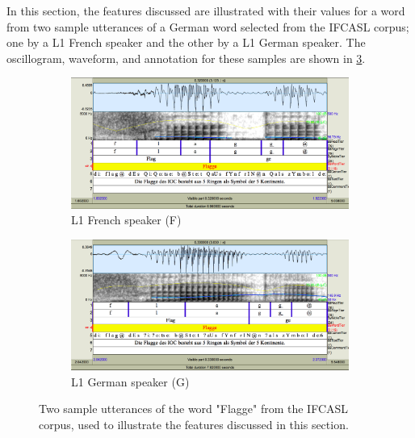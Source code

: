 	
	In this section, the features discussed are illustrated with their values for a word from two sample utterances of a German word selected from the IFCASL corpus; one by a L1 French speaker and the other by a L1 German speaker. The oscillogram, waveform, and annotation for these samples are shown in \cref{fig:featuresexample}.
	
	\begin{figure}
		\centering
		\begin{subfigure}[t]{\textwidth}
                \includegraphics[width=\textwidth]{img/screenshots/2SH05_FGMB1_527-flagge}
                \caption{L1 French speaker (F)}
                \label{fig:featuresexample:fg}
        \end{subfigure}%
        \vspace{1.5em}
                \vspace{1.5em}

        \begin{subfigure}[b]{\textwidth}
                \includegraphics[width=\textwidth]{img/screenshots/2SH05_GGMB2_035-flagge}
                \caption{L1 German speaker (G)}
                \label{fig:featuresexample:gg}
        \end{subfigure}%
		\caption{Two sample utterances of the word "Flagge" from the IFCASL corpus, used to illustrate the features discussed in this section. }
		\label{fig:featuresexample}
	\end{figure}
	
